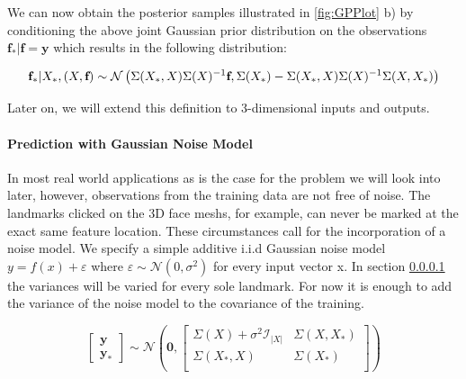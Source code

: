 We can now obtain the posterior samples illustrated in \ref{fig:GPPlot} b) by conditioning the above joint Gaussian prior distribution on the observations $\textbf{f}_{*}\vert\textbf{f}=\textbf{y}$ which results in the following distribution:

\begin{equation}
    \textbf{f}_{*}\vert X_{*},(X,\textbf{f}) \sim \mathcal{N}\left(\Sigma(X_{*},X)\Sigma(X)^{-1}\textbf{f},\\\Sigma(X_{*})-\Sigma(X_{*},X)\Sigma(X)^{-1}\Sigma(X,X_{*})\right)
\end{equation}

Later on, we will extend this definition to 3-dimensional inputs and outputs.

\paragraph{Prediction with Gaussian Noise Model}
In most real world applications as is the case for the problem we will look into later, however, observations from the training data are not free of noise. The landmarks clicked on the 3D face meshs, for example, can never be marked at the exact same feature location. These circumstances call for the incorporation of a noise model. We specify a simple additive i.i.d Gaussian noise model $y = f(x) + \varepsilon$ where $\varepsilon \sim \mathcal{N}(0, \sigma^2)$ for every input vector x. In section
\ref{} the variances will be varied for every sole landmark.
For now it is enough to add the variance of the noise model to the covariance of the training.

\begin{equation}
\begin{bmatrix}\textbf{y}\\\textbf{y}_{*}\end{bmatrix}
\sim \mathcal{N}\left(\textbf{0},
\begin{bmatrix}
    \Sigma(X) + \sigma^2\mathcal{I}_{\left|X \right|} & \Sigma(X,X_{*})\\
    \Sigma(X_{*},X) & \Sigma(X_{*})\\
\end{bmatrix}
\right)
\end{equation}

